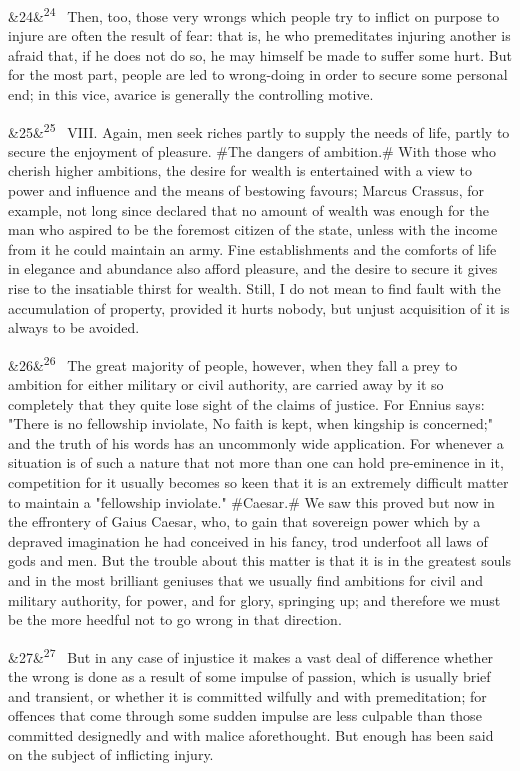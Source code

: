 \documentclass[12pt]{article}
\newcommand{\para}[1][]{\par\noindent\ifx&#1&\else\textsuperscript{\footnotesize #1}~\fi}
\begin{document}
\para[24] Then, too, those very wrongs which people try to inflict on purpose to injure are often the result of fear: that is, he who premeditates injuring another is afraid that, if he does not do so, he may himself be made to suffer some hurt. But for the most part, people are led to wrong-doing in order to secure some personal end; in this vice, avarice is generally the controlling motive.

\para[25] VIII. Again, men seek riches partly to supply the needs of life, partly to secure the enjoyment of pleasure. \#The dangers of ambition.\# With those who cherish higher ambitions, the desire for wealth is entertained with a view to power and influence and the means of bestowing favours; Marcus Crassus, for example, not long since declared that no amount of wealth was enough for the man who aspired to be the foremost citizen of the state, unless with the income from it he could maintain an army. Fine establishments and the comforts of life in elegance and abundance also afford pleasure, and the desire to secure it gives rise to the insatiable thirst for wealth. Still, I do not mean to find fault with the accumulation of property, provided it hurts nobody, but unjust acquisition of it is always to be avoided.

\para[26] The great majority of people, however, when they fall a prey to ambition for either military or civil authority, are carried away by it so completely that they quite lose sight of the claims of justice. For Ennius says: "There is no fellowship inviolate, No faith is kept, when kingship is concerned;" and the truth of his words has an uncommonly wide application. For whenever a situation is of such a nature that not more than one can hold pre-eminence in it, competition for it usually becomes so keen that it is an extremely difficult matter to maintain a "fellowship inviolate." \#Caesar.\# We saw this proved but now in the effrontery of Gaius Caesar, who, to gain that sovereign power which by a depraved imagination he had conceived in his fancy, trod underfoot all laws of gods and men. But the trouble about this matter is that it is in the greatest souls and in the most brilliant geniuses that we usually find ambitions for civil and military authority, for power, and for glory, springing up; and therefore we must be the more heedful not to go wrong in that direction.

\para[27] But in any case of injustice it makes a vast deal of difference whether the wrong is done as a result of some impulse of passion, which is usually brief and transient, or whether it is committed wilfully and with premeditation; for offences that come through some sudden impulse are less culpable than those committed designedly and with malice aforethought. But enough has been said on the subject of inflicting injury.
\end{document}
